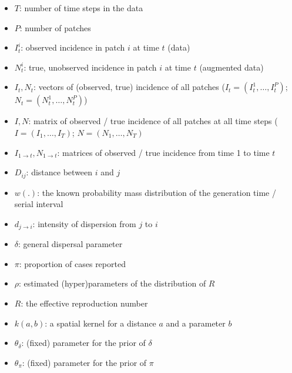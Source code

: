 \documentclass[a4paper,11pt]{article}
\begin{document}
\begin{itemize}
 \item $T$: number of time steps in the data
 \item $P$: number of patches
 \item $I_t^i$: observed incidence in patch $i$ at time $t$ (data)
 \item $N_t^i$: true, unobserved incidence in patch $i$ at time $t$ (augmented 
data)
 \item $I_t, N_t$: vectors of (observed, true) incidence of all patches 
 ($I_t = (I_t^1, \ldots, I_t^P)$; $N_t = (N_t^1, \ldots, N_t^P)$)
 \item $I,N$: matrix of observed / true incidence of all patches at all time 
steps ($I = (I_1, \ldots, I_T)$; $N = (N_1, \ldots, N_T)$
 \item $I_{1 \rightarrow t}, N_{1 \rightarrow t}$: matrices of observed / true 
incidence from time 1 to time $t$ 
 \item $D_{ij}$: distance between $i$ and $j$
 \item $w(.)$: the known probability mass distribution of the generation time / serial interval
 \item $d_{j\rightarrow i}$: intensity of dispersion from $j$ to $i$
 \item $\delta$: general dispersal parameter
 \item $\pi$: proportion of cases reported
 \item $\rho$: estimated (hyper)parameters of the distribution of $R$
 \item $R$: the effective reproduction 
number
 \item $k(a,b)$: a spatial kernel for a distance $a$ and a parameter $b$
 \item $\theta_{\delta}$: (fixed) parameter for the prior of 
$\delta$
 \item $\theta_{\pi}$: (fixed) parameter for the prior of $\pi$
\end{itemize}





\end{document}
